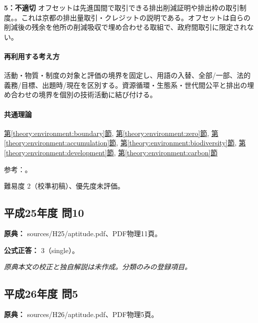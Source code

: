 \noindent\textbf{5：不適切} オフセットは先進国間で取引できる排出削減証明や排出枠の取引制度。。これは京都の排出量取引・クレジットの説明である。オフセットは自らの削減後の残余を他所の削減吸収で埋め合わせる取組で、政府間取引に限定されない。\par

\paragraph{再利用する考え方} 活動・物質・制度の対象と評価の境界を固定し、用語の入替、全部/一部、法的義務/目標、出題時/現在を区別する。資源循環・生態系・世代間公平と排出の埋め合わせの境界を個別の技術活動に結び付ける。

\paragraph{共通理論} \hyperref[theory:environment:boundary]{第\ref*{theory:environment:boundary}節}, \hyperref[theory:environment:zero]{第\ref*{theory:environment:zero}節}, \hyperref[theory:environment:accumulation]{第\ref*{theory:environment:accumulation}節}, \hyperref[theory:environment:biodiversity]{第\ref*{theory:environment:biodiversity}節}, \hyperref[theory:environment:development]{第\ref*{theory:environment:development}節}, \hyperref[theory:environment:carbon]{第\ref*{theory:environment:carbon}節}

\par 参考：\cite{env_zero2008,env_foodchain,env_biodiversity,env_development,env_offset2008}。

\par 難易度 2（校準初稿）、優先度未評価。

\subsection{平成25年度 問10}
\label{q:h25-reg-apt-10}

\noindent\textbf{原典：} sources/H25/aptitude.pdf、PDF物理11頁。

\textbf{公式正答：} 3（single）。

\par\textit{原典本文の校正と独自解説は未作成。分類のみの登録項目。}

\subsection{平成26年度 問5}
\label{q:h26-reg-apt-05}

\noindent\textbf{原典：} sources/H26/aptitude.pdf、PDF物理5頁。

